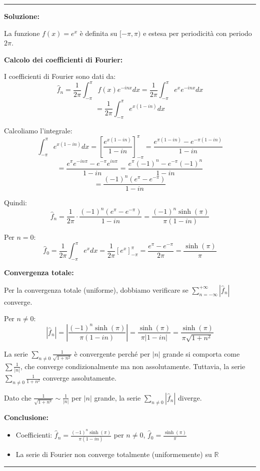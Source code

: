 \documentclass[12pt, a4paper]{article}
\newenvironment{solution}
{\par\noindent\rule{\textwidth}{0.4pt}\par\textbf{Soluzione:}\medskip\par}
{\par\rule{\textwidth}{0.4pt}\par\bigskip}
\begin{document}
\begin{solution}
La funzione $f(x) = e^x$ è definita su $[-\pi, \pi)$ e estesa per periodicità con periodo $2\pi$.

\textbf{Calcolo dei coefficienti di Fourier:}

I coefficienti di Fourier sono dati da:
\[
\hat{f}_n = \frac{1}{2\pi} \int_{-\pi}^{\pi} f(x) e^{-inx} dx = \frac{1}{2\pi} \int_{-\pi}^{\pi} e^x e^{-inx} dx
\]
\[
= \frac{1}{2\pi} \int_{-\pi}^{\pi} e^{x(1-in)} dx
\]

Calcoliamo l'integrale:
\[
\int_{-\pi}^{\pi} e^{x(1-in)} dx = \left[ \frac{e^{x(1-in)}}{1-in} \right]_{-\pi}^{\pi} = \frac{e^{\pi(1-in)} - e^{-\pi(1-in)}}{1-in}
\]
\[
= \frac{e^{\pi} e^{-in\pi} - e^{-\pi} e^{in\pi}}{1-in} = \frac{e^{\pi} (-1)^n - e^{-\pi} (-1)^n}{1-in}
\]
\[
= \frac{(-1)^n (e^{\pi} - e^{-\pi})}{1-in}
\]

Quindi:
\[
\hat{f}_n = \frac{1}{2\pi} \cdot \frac{(-1)^n (e^{\pi} - e^{-\pi})}{1-in} = \frac{(-1)^n \sinh(\pi)}{\pi(1-in)}
\]

Per $n = 0$:
\[
\hat{f}_0 = \frac{1}{2\pi} \int_{-\pi}^{\pi} e^x dx = \frac{1}{2\pi} [e^x]_{-\pi}^{\pi} = \frac{e^{\pi} - e^{-\pi}}{2\pi} = \frac{\sinh(\pi)}{\pi}
\]

\textbf{Convergenza totale:}

Per la convergenza totale (uniforme), dobbiamo verificare se $\displaystyle\sum_{n=-\infty}^{+\infty} |\hat{f}_n|$ converge.

Per $n \neq 0$:
\[
|\hat{f}_n| = \left|\frac{(-1)^n \sinh(\pi)}{\pi(1-in)}\right| = \frac{\sinh(\pi)}{\pi|1-in|} = \frac{\sinh(\pi)}{\pi\sqrt{1+n^2}}
\]

La serie $\displaystyle\sum_{n \neq 0} \frac{1}{\sqrt{1+n^2}}$ è convergente perché per $|n|$ grande si comporta come $\sum \frac{1}{|n|}$, che converge condizionalmente ma non assolutamente. Tuttavia, la serie $\displaystyle\sum_{n \neq 0} \frac{1}{1+n^2}$ converge assolutamente.

Dato che $\frac{1}{\sqrt{1+n^2}} \sim \frac{1}{|n|}$ per $|n|$ grande, la serie $\displaystyle\sum_{n \neq 0} |\hat{f}_n|$ diverge.

\textbf{Conclusione:} 
\begin{itemize}
    \item Coefficienti: $\hat{f}_n = \frac{(-1)^n \sinh(\pi)}{\pi(1-in)}$ per $n \neq 0$, $\hat{f}_0 = \frac{\sinh(\pi)}{\pi}$
    \item La serie di Fourier non converge totalmente (uniformemente) su $\mathbb{R}$
\end{itemize}
\end{solution}
\end{document}
